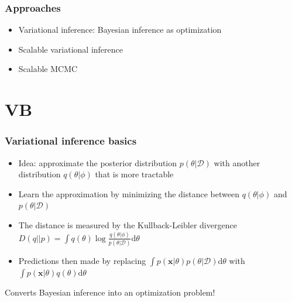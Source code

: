 \documentclass{beamer}
\newcommand{\dataset}{\mathcal{D}}
\newcommand{\parameters}{\theta}
\newcommand{\vparameters}{\phi}
\newcommand{\vx}{\mathbf{x}}
\newcommand{\diff}{\mathrm{d}}
\begin{document}
\begin{frame}
  \frametitle{Approaches}

  \begin{itemize}
    \item Variational inference: Bayesian inference as optimization
    \item Scalable variational inference
    \item Scalable MCMC
  \end{itemize}
\end{frame}

\section{VB}


\begin{frame}
  \frametitle{Variational inference basics}

  \begin{itemize}
  \item Idea: approximate the posterior distribution $p(\parameters | \dataset)$
    with another distribution $q(\parameters|\vparameters)$ that is more
    tractable
  \item Learn the approximation by minimizing the distance between $q(\parameters|\vparameters)$ and $p(\parameters | \dataset)$
  \item The distance is measured by the Kullback-Leibler divergence
    $D(q||p) = \int q(\parameters) \log \frac{q(\parameters|\vparameters)}{p(\parameters| \dataset)}\diff \parameters$
  \item Predictions then made by replacing $\int p(\vx|\parameters) p(\parameters | \dataset) \diff \parameters$ with
    $\int p(\vx|\parameters) q(\parameters) \diff \parameters$
  \end{itemize}

  Converts Bayesian inference into an optimization problem!
\end{frame}

\end{document}
